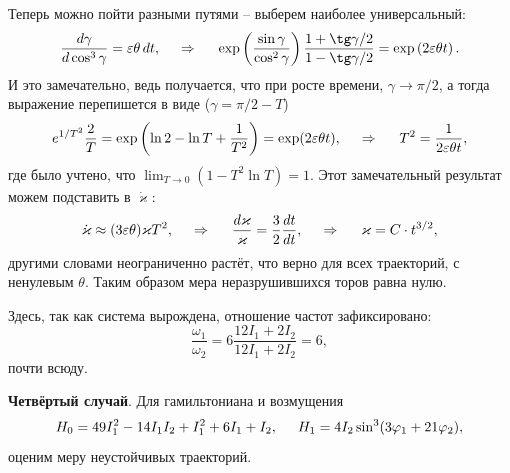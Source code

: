 Теперь можно пойти разными путями -- выберем наиболее универсальный:
\begin{equation*}
\frac{d \gamma}{d \cos^3 \gamma}  = \varepsilon \theta \d t,
\hspace{0.5cm} \Rightarrow \hspace{0.5cm}
    \exp\left(\frac{\sin \gamma}{\cos^2 \gamma}\right) \frac{1 + \tg \gamma/2}{1-\tg \gamma/2} = \exp\left( 2 \varepsilon \theta t\right).
\end{equation*}
И это замечательно, ведь получается, что при росте времени, $\gamma \to \pi/2$, а тогда выражение перепишется в виде ($\gamma = \pi/2-T$)
\begin{equation*}
    e^{1/T^2} \frac{2}{T} = \exp\left(
        \ln 2 - \ln T + \frac{1}{T^2}
    \right) = \exp(2 \varepsilon \theta t),
    \hspace{0.5cm} \Rightarrow \hspace{0.5cm}
    T^2 = \frac{1}{2\varepsilon \theta t},
\end{equation*}
где было учтено, что $\lim_{T\to 0} (1 - T^2 \ln T) = 1$. Этот замечательный результат можем подставить в $\dot{\varkappa}$:
\begin{equation*}
    \dot{\varkappa} \approx (3 \varepsilon \theta) \varkappa T^2,
    \hspace{0.5cm} \Rightarrow \hspace{0.5cm}
    \frac{d \varkappa}{\varkappa} = \frac{3}{2} \frac{d t}{d t},
    \hspace{0.5cm} \Rightarrow \hspace{0.5cm}
    \varkappa = C \cdot t^{3/2},
\end{equation*}
другими словами неограниченно растёт, что верно для всех траекторий, с ненулевым $\theta$. Таким образом мера неразрушившихся торов равна нулю. 

Здесь, так как система вырождена, отношение частот зафиксировано:
\begin{equation*}
    \frac{\omega_1}{\omega_2} = 6 \frac{12 I_1 + 2 I_2}{12I_1 + 2 I_2} = 6,
\end{equation*}
почти всюду. 





\textbf{Четвёртый случай}. Для гамильтониана и возмущения
\begin{equation*}
    H_0 = 49 I_1^2 - 14 I_1 I_2 + I_1^2 + 6 I_1 + I_2,
    \hspace{5 mm} 
    H_1 = 4 I_2 \sin^3 (3 \varphi_1 +  21 \varphi_2),
\end{equation*}
оценим меру неустойчивых траекторий. 

